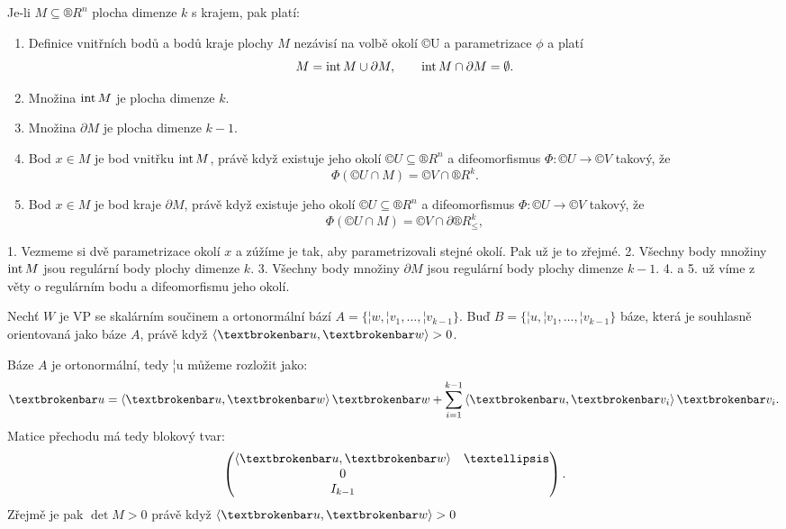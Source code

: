 \documentclass[12pt]{article}                   %
\begin{document}
        \begin{lemma}
            Je-li $M \subseteq ®R^n$ plocha dimenze $k$ s krajem, pak platí:
            
            \begin{enumerate}
                \item Definice vnitřních bodů a bodů kraje plochy $M$ nezávisí na volbě okolí ©U a parametrizace $\phi$ a platí
                        $$ M = \operatorname{int} M \cup \partial M, \qquad \operatorname{int} M \cap \partial M = \emptyset. $$ 
                \item Množina $\operatorname{int} M$ je plocha dimenze $k$.
                \item Množina $\partial M$ je plocha dimenze $k-1$.
                \item Bod $x \in M$ je bod vnitřku $\operatorname{int} M$, právě když existuje jeho okolí $©U \subseteq ®R^n$ a difeomorfismus $\Phi: ©U \rightarrow ©V$ takový, že
                        $$ \Phi(©U \cap M) = ©V \cap ®R^k. $$
                \item Bod $x \in M$ je bod kraje $\partial M$, právě když existuje jeho okolí $©U \subseteq ®R^n$ a difeomorfismus $\Phi: ©U \rightarrow ©V$ takový, že
                        $$ \Phi(©U \cap M) = ©V \cap \partial ®R^k_{≤}, $$
            \end{enumerate}

            \begin{dukazin}
                1. Vezmeme si dvě parametrizace okolí $x$ a zúžíme je tak, aby parametrizovali stejné okolí. Pak už je to zřejmé. 2. Všechny body množiny $\operatorname{int} M$ jsou regulární body plochy dimenze $k$. 3. Všechny body množiny $\partial M$ jsou regulární body plochy dimenze $k-1$. 4. a 5. už víme z věty o regulárním bodu a difeomorfismu jeho okolí.
            \end{dukazin}
        \end{lemma}

        \begin{lemma}
            Nechť $W$ je VP se skalárním součinem a ortonormální bází $A = \{¦w, ¦v_1, …, ¦v_{k-1}\}$. Buď $B = \{¦u, ¦v_1, …, ¦v_{k-1}\}$ báze, která je souhlasně orientovaná jako báze $A$, právě když $\<¦u, ¦w\> > 0$.

            \begin{dukazin}
                Báze $A$ je ortonormální, tedy ¦u můžeme rozložit jako:
                $$ ¦u = \<¦u, ¦w\>¦w + \sum_{i=1}^{k-1} \<¦u, ¦v_i\>¦v_i. $$
                Matice přechodu má tedy blokový tvar:
                $$ \begin{pmatrix} \<¦u, ¦w\> & … \\ 0 \\ I_{k-1} \end{pmatrix}. $$
                Zřejmě je pak $\det M > 0$ právě když $\<¦u, ¦w\> > 0$
            \end{dukazin}
        \end{lemma}
\end{document}
